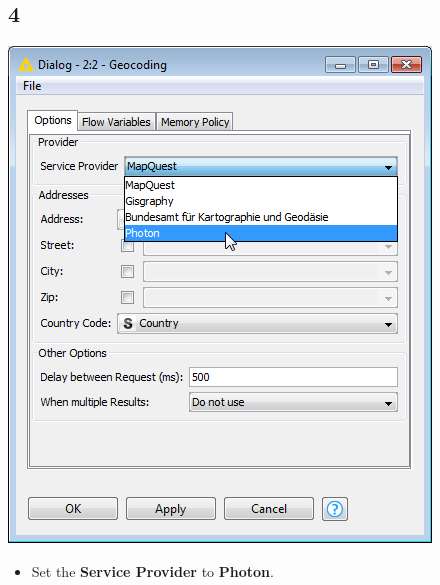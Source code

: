 \documentclass{beamer}
\begin{document}
\subsection{4}
\begin{frame}
	\begin{center}
  		\includegraphics[height=0.6\textheight]{4.png}
	\end{center}
	\begin{itemize}
        \item Set the \textbf{Service Provider} to \textbf{Photon}.
	\end{itemize}
\end{frame}
\end{document}
